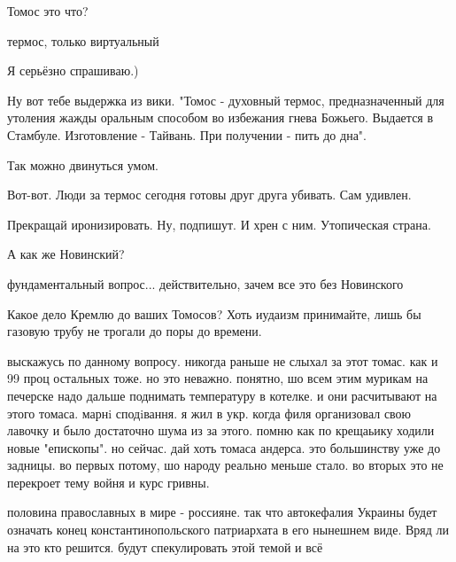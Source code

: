 \begin{itemize}
\begin{itemize}
\end{itemize} %

Томос это что?

\begin{itemize} %
термос, только виртуальный

Я серьёзно спрашиваю.)


Ну вот тебе выдержка из вики. "Томос - духовный термос, предназначенный для
утоления жажды оральным способом во избежания гнева Божьего. Выдается в
Стамбуле. Изготовление - Тайвань. При получении - пить до дна".

Так можно двинуться умом.

Вот-вот. Люди за термос сегодня готовы друг друга убивать. Сам удивлен.

Прекращай иронизировать. Ну, подпишут. И хрен с ним. Утопическая страна.
\end{itemize} %


А как же Новинский?

\begin{itemize} %
фундаментальный вопрос... действительно, зачем все это без Новинского
\end{itemize} %

Какое дело Кремлю до ваших Томосов? Хоть иудаизм принимайте, лишь бы газовую трубу не трогали до поры до времени.


выскажусь по данному вопросу. никогда раньше не слыхал за этот томас. как и 99
проц остальных тоже. но это неважно. понятно, шо всем этим мурикам на печерске
надо дальше поднимать температуру в котелке. и они расчитывают на этого томаса.
марнi сподiвання. я жил в укр. когда филя организовал свою лавочку и было
достаточно шума из за этого. помню как по крещаьику ходили новые "епископы". но
сейчас. дай хоть томаса андерса. это большинству уже до задницы. во первых
потому, шо народу реально меньше стало. во вторых это не перекроет тему войня и
курс гривны.



половина православных в мире - россияне. так что автокефалия Украины будет
означать конец константинопольского патриархата в его нынешнем виде. Вряд ли на
это кто решится. будут спекулировать этой темой и всё


\end{itemize}

